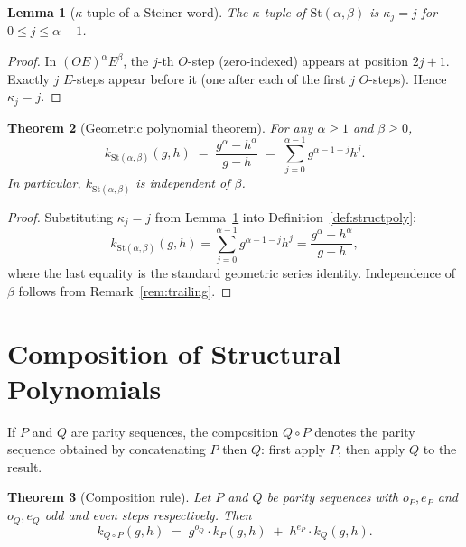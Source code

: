 \documentclass[12pt]{article}
\newtheorem{theorem}{Theorem}[section]
\newtheorem{lemma}[theorem]{Lemma}
\theoremstyle{definition}
\theoremstyle{remark}
\newcommand{\St}{\mathrm{St}}
\newcommand{\kpoly}{k}
\begin{document}
\begin{lemma}[$\kappa$-tuple of a Steiner word]
\label{lem:profile}
The $\kappa$-tuple of $\St(\alpha,\beta)$ is $\kappa_j = j$ for
$0 \leq j \leq \alpha - 1$.
\end{lemma}

\begin{proof}
In $(OE)^\alpha E^\beta$, the $j$-th $O$-step (zero-indexed) appears at
position $2j+1$.  Exactly $j$ $E$-steps appear before it (one after each of
the first $j$ $O$-steps).  Hence $\kappa_j = j$.
\end{proof}

\begin{theorem}[Geometric polynomial theorem]
\label{thm:geometric}
For any $\alpha \geq 1$ and $\beta \geq 0$,
\begin{equation}
  \label{eq:geometric}
  \kpoly_{\St(\alpha,\beta)}(g,h) \;=\; \frac{g^\alpha - h^\alpha}{g - h}
  \;=\; \sum_{j=0}^{\alpha-1} g^{\alpha-1-j} h^j.
\end{equation}
In particular, $\kpoly_{\St(\alpha,\beta)}$ is independent of $\beta$.
\end{theorem}

\begin{proof}
Substituting $\kappa_j = j$ from Lemma~\ref{lem:profile} into
Definition~\ref{def:structpoly}:
\[
  \kpoly_{\St(\alpha,\beta)}(g,h)
  = \sum_{j=0}^{\alpha-1} g^{\alpha-1-j} h^j
  = \frac{g^\alpha - h^\alpha}{g-h},
\]
where the last equality is the standard geometric series identity.
Independence of $\beta$ follows from Remark~\ref{rem:trailing}.
\end{proof}

\section{Composition of Structural Polynomials}
\label{sec:composition}

If $P$ and $Q$ are parity sequences, the composition $Q \circ P$ denotes the
parity sequence obtained by concatenating $P$ then $Q$: first apply $P$,
then apply $Q$ to the result.

\begin{theorem}[Composition rule]
\label{thm:composition}
Let $P$ and $Q$ be parity sequences with $o_P, e_P$ and $o_Q, e_Q$ odd and
even steps respectively.  Then
\begin{equation}
  \label{eq:composition}
  \kpoly_{Q \circ P}(g,h)
  \;=\; g^{o_Q} \cdot \kpoly_P(g,h) \;+\; h^{e_P} \cdot \kpoly_Q(g,h).
\end{equation}
\end{theorem}
\end{document}
